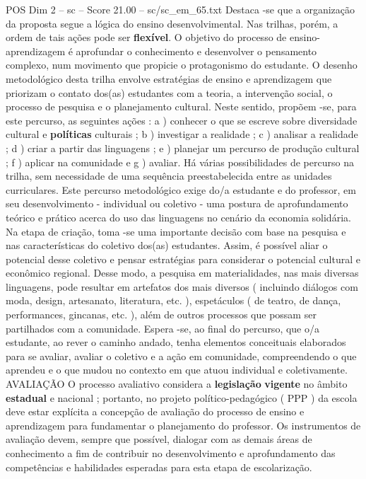 \begin{textsample}{POS Dim 2 – sc – Score 21.00 – sc/sc\_em\_65.txt}
Destaca -se que a organização da proposta segue a lógica do ensino desenvolvimental.
Nas trilhas, porém, a ordem de tais ações pode ser \textbf{flexível}.
O objetivo do processo de ensino-aprendizagem é aprofundar o conhecimento e desenvolver o pensamento complexo, num movimento que propicie o protagonismo do estudante.
O desenho metodológico desta trilha envolve estratégias de ensino e aprendizagem que priorizam o contato dos(as) estudantes com a teoria, a intervenção social, o processo de pesquisa e o planejamento cultural.
Neste sentido, propõem -se, para este percurso, as seguintes ações : a ) conhecer o que se escreve sobre diversidade cultural e \textbf{políticas} culturais ; b ) investigar a realidade ; c ) analisar a realidade ; d ) criar a partir das linguagens ; e ) planejar um percurso de produção cultural ; f ) aplicar na comunidade e g ) avaliar.
Há várias possibilidades de percurso na trilha, sem necessidade de uma sequência preestabelecida entre as unidades curriculares.
Este percurso metodológico exige do/a estudante e do professor, em seu desenvolvimento - individual ou coletivo - uma postura de aprofundamento teórico e prático acerca do uso das linguagens no cenário da economia solidária.
Na etapa de criação, toma -se uma importante decisão com base na pesquisa e nas características do coletivo dos(as) estudantes.
Assim, é possível aliar o potencial desse coletivo e pensar estratégias para considerar o potencial cultural e econômico regional.
Desse modo, a pesquisa em materialidades, nas mais diversas linguagens, pode resultar em artefatos dos mais diversos ( incluindo diálogos com moda, design, artesanato, literatura, etc. ), espetáculos ( de teatro, de dança, performances, gincanas, etc. ), além de outros processos que possam ser partilhados com a comunidade.
Espera -se, ao final do percurso, que o/a estudante, ao rever o caminho andado, tenha elementos conceituais elaborados para se avaliar, avaliar o coletivo e a ação em comunidade, compreendendo o que aprendeu e o que mudou no contexto em que atuou individual e coletivamente.
AVALIAÇÃO O processo avaliativo considera a \textbf{legislação} \textbf{vigente} no âmbito \textbf{estadual} e nacional ; portanto, no projeto político-pedagógico ( PPP ) da escola deve estar explícita a concepção de avaliação do processo de ensino e aprendizagem para fundamentar o planejamento do professor.
Os instrumentos de avaliação devem, sempre que possível, dialogar com as demais áreas de conhecimento a fim de contribuir no desenvolvimento e aprofundamento das competências e habilidades esperadas para esta etapa de escolarização.

\end{textsample}

